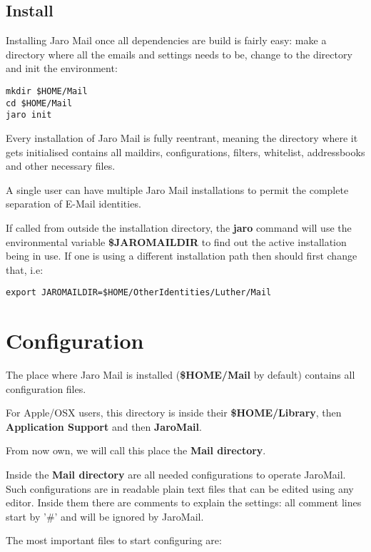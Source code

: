 \documentclass[a4,onecolumn,portrait]{article}
\begin{document}
\subsection{Install}
\label{sec-3-2}

Installing Jaro Mail once all dependencies are build is fairly
easy: make a directory where all the emails and settings needs to be, change to the directory and init the environment:

\begin{verbatim}
mkdir $HOME/Mail
cd $HOME/Mail
jaro init
\end{verbatim}

Every installation of Jaro Mail is fully reentrant, meaning the directory where it gets initialised contains all maildirs, configurations, filters, whitelist, addressbooks and other necessary files.

A single user can have multiple Jaro Mail installations to permit the complete separation of E-Mail identities.

If called from outside the installation directory, the \textbf{jaro} command will use the environmental variable \textbf{\$JAROMAILDIR} to find out the active installation being in use. If one is using a different installation path then should first change that, i.e:

\begin{verbatim}
export JAROMAILDIR=$HOME/OtherIdentities/Luther/Mail
\end{verbatim}
\section{Configuration}
\label{sec-4}

The place where Jaro Mail is installed (\textbf{\$HOME/Mail} by default)
contains all configuration files.

For Apple/OSX users, this directory is inside their \textbf{\$HOME/Library}, then \textbf{Application Support} and then \textbf{JaroMail}.

From now own, we will call this place the \textbf{Mail directory}.

Inside the \textbf{Mail directory} are all needed configurations to operate JaroMail. Such configurations are in readable plain text files that can be edited using any editor. Inside them there are comments to explain the settings: all comment lines start by '\#' and will be ignored by JaroMail.

The most important files to start configuring are:
\end{document}
